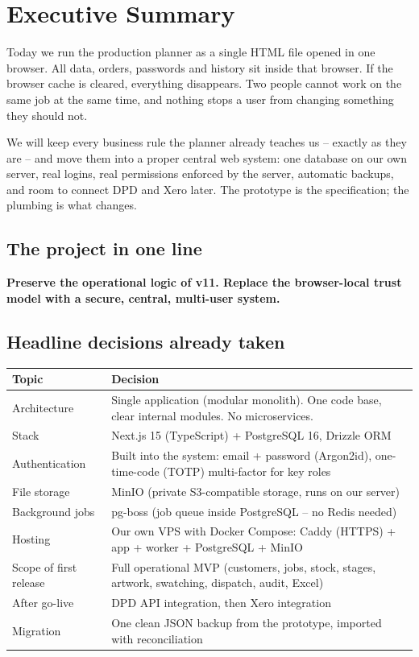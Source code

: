 \section{Executive Summary}

\begin{plainwords}
Today we run the production planner as a single HTML file opened in one browser. All data,
orders, passwords and history sit inside that browser. If the browser cache is cleared,
everything disappears. Two people cannot work on the same job at the same time, and nothing
stops a user from changing something they should not.

We will keep every business rule the planner already teaches us -- exactly as they are -- and
move them into a proper central web system: one database on our own server, real logins,
real permissions enforced by the server, automatic backups, and room to connect DPD and
Xero later. The prototype is the specification; the plumbing is what changes.
\end{plainwords}

\subsection*{The project in one line}

\textbf{Preserve the operational logic of v11. Replace the browser-local trust model with a
secure, central, multi-user system.}

\subsection*{Headline decisions already taken}

\begin{tabularx}{\textwidth}{@{}l X@{}}
\toprule
\textbf{Topic} & \textbf{Decision} \\
\midrule
Architecture & Single application (modular monolith). One code base, clear internal
  modules. No microservices. \\
Stack & Next.js 15 (TypeScript) + PostgreSQL 16, Drizzle ORM \\
Authentication & Built into the system: email + password (Argon2id), one-time-code (TOTP)
  multi-factor for key roles \\
File storage & MinIO (private S3-compatible storage, runs on our server) \\
Background jobs & pg-boss (job queue inside PostgreSQL -- no Redis needed) \\
Hosting & Our own VPS with Docker Compose: Caddy (HTTPS) + app + worker + PostgreSQL +
  MinIO \\
Scope of first release & Full operational MVP (customers, jobs, stock, stages, artwork,
  swatching, dispatch, audit, Excel) \\
After go-live & DPD API integration, then Xero integration \\
Migration & One clean JSON backup from the prototype, imported with reconciliation \\
\bottomrule
\end{tabularx}

